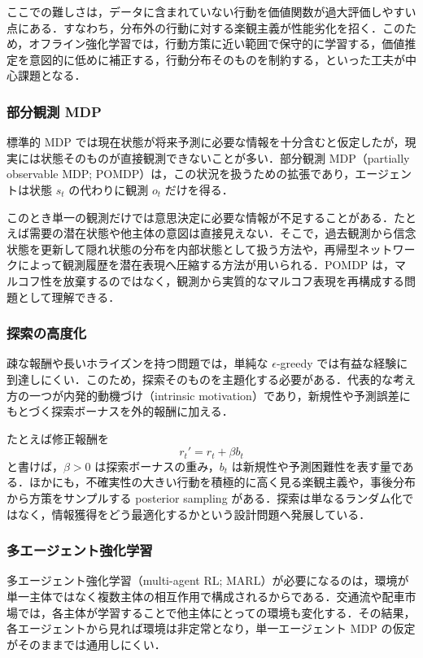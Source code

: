 ここでの難しさは，データに含まれていない行動を価値関数が過大評価しやすい点にある．すなわち，分布外の行動に対する楽観主義が性能劣化を招く．このため，オフライン強化学習では，行動方策に近い範囲で保守的に学習する，価値推定を意図的に低めに補正する，行動分布そのものを制約する，といった工夫が中心課題となる．

\subsubsection{部分観測 MDP}

標準的 MDP では現在状態が将来予測に必要な情報を十分含むと仮定したが，現実には状態そのものが直接観測できないことが多い．部分観測 MDP（partially observable MDP; POMDP）は，この状況を扱うための拡張であり，エージェントは状態 $s_t$ の代わりに観測 $o_t$ だけを得る．

このとき単一の観測だけでは意思決定に必要な情報が不足することがある．たとえば需要の潜在状態や他主体の意図は直接見えない．そこで，過去観測から信念状態を更新して隠れ状態の分布を内部状態として扱う方法や，再帰型ネットワークによって観測履歴を潜在表現へ圧縮する方法が用いられる．POMDP は，マルコフ性を放棄するのではなく，観測から実質的なマルコフ表現を再構成する問題として理解できる．

\subsubsection{探索の高度化}

疎な報酬や長いホライズンを持つ問題では，単純な $\epsilon$-greedy では有益な経験に到達しにくい．このため，探索そのものを主題化する必要がある．代表的な考え方の一つが内発的動機づけ（intrinsic motivation）であり，新規性や予測誤差にもとづく探索ボーナスを外的報酬に加える．

たとえば修正報酬を
\begin{equation}
r_t' = r_t + \beta b_t
\end{equation}
と書けば，$\beta > 0$ は探索ボーナスの重み，$b_t$ は新規性や予測困難性を表す量である．ほかにも，不確実性の大きい行動を積極的に高く見る楽観主義や，事後分布から方策をサンプルする posterior sampling がある．探索は単なるランダム化ではなく，情報獲得をどう最適化するかという設計問題へ発展している．

\subsubsection{多エージェント強化学習}

多エージェント強化学習（multi-agent RL; MARL）が必要になるのは，環境が単一主体ではなく複数主体の相互作用で構成されるからである．交通流や配車市場では，各主体が学習することで他主体にとっての環境も変化する．その結果，各エージェントから見れば環境は非定常となり，単一エージェント MDP の仮定がそのままでは通用しにくい．

